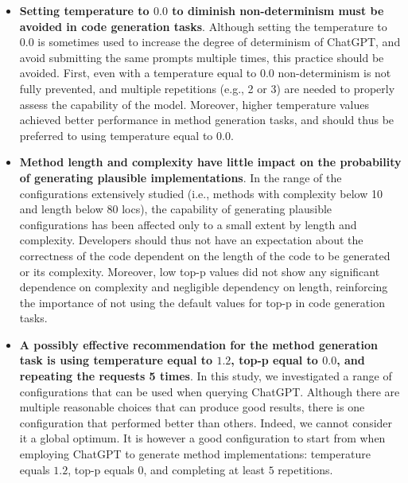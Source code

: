 \begin{itemize}
\item \textbf{Setting temperature to $0.0$ to diminish non-determinism must be avoided in code generation tasks}. Although setting the temperature to $0.0$ is sometimes used to increase the degree of determinism of ChatGPT, and avoid submitting the same prompts multiple times, this practice should be avoided. First, even with a temperature equal to $0.0$ non-determinism is not fully prevented, and multiple repetitions (e.g., 2 or 3) are needed to properly assess the capability of the model. Moreover, higher temperature values achieved better performance in method generation tasks, and should thus be preferred to using temperature equal to $0.0$.

\item \textbf{Method length and complexity have little impact on the probability of generating plausible implementations}. In the range of the configurations extensively studied (i.e., methods with complexity below 10 and length below 80 locs), the capability of generating plausible configurations has been affected only to a small extent by length and complexity. Developers should thus not have an expectation about the correctness of the code dependent on the length of the code to be generated or its complexity. Moreover, low top-p values did not show any significant dependence on complexity and negligible dependency on length, reinforcing the importance of not using the default values for top-p in code generation tasks. 

\item \textbf{A possibly effective recommendation for the method generation task is using temperature equal to $1.2$, top-p equal to $0.0$, and repeating the requests 5 times}. In this study, we investigated a range of configurations that can be used when querying ChatGPT. Although there are multiple reasonable choices that can produce good results, there is one configuration that performed better than others. Indeed, we cannot consider it a global optimum. It is however a good configuration to start from when employing ChatGPT to generate method implementations: temperature equals $1.2$, top-p equals 0, and completing at least $5$ repetitions.


\end{itemize}
